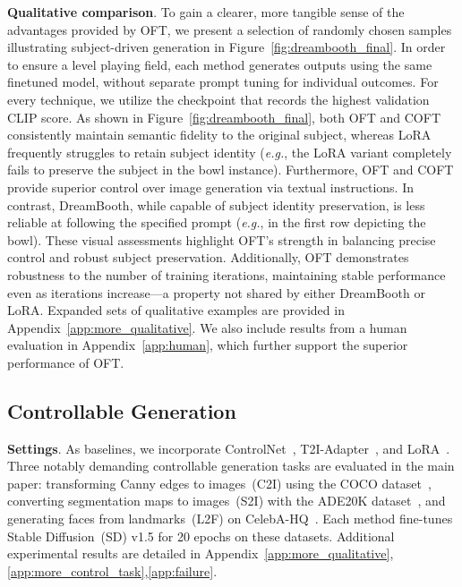 \textbf{Qualitative comparison}. To gain a clearer, more tangible sense of the advantages provided by OFT, we present a selection of randomly chosen samples illustrating subject-driven generation in Figure~\ref{fig:dreambooth_final}. In order to ensure a level playing field, each method generates outputs using the same finetuned model, without separate prompt tuning for individual outcomes. For every technique, we utilize the checkpoint that records the highest validation CLIP score. As shown in Figure~\ref{fig:dreambooth_final}, both OFT and COFT consistently maintain semantic fidelity to the original subject, whereas LoRA frequently struggles to retain subject identity (\emph{e.g.}, the LoRA variant completely fails to preserve the subject in the bowl instance). Furthermore, OFT and COFT provide superior control over image generation via textual instructions. In contrast, DreamBooth, while capable of subject identity preservation, is less reliable at following the specified prompt (\emph{e.g.}, in the first row depicting the bowl). These visual assessments highlight OFT’s strength in balancing precise control and robust subject preservation. Additionally, OFT demonstrates robustness to the number of training iterations, maintaining stable performance even as iterations increase—a property not shared by either DreamBooth or LoRA. Expanded sets of qualitative examples are provided in Appendix~\ref{app:more_qualitative}. We also include results from a human evaluation in Appendix~\ref{app:human}, which further support the superior performance of OFT.

\subsection{Controllable Generation}

\textbf{Settings}. As baselines, we incorporate ControlNet~\cite{zhang2023adding}, T2I-Adapter~\cite{mou2023t2i}, and LoRA~\cite{hulora2022}. Three notably demanding controllable generation tasks are evaluated in the main paper: transforming Canny edges to images~(C2I) using the COCO dataset~\cite{lin2014microsoft}, converting segmentation maps to images~(S2I) with the ADE20K dataset~\cite{zhou2017scene}, and generating faces from landmarks~(L2F) on CelebA-HQ~\cite{karras2018progressive,xia2021tedigan}. Each method fine-tunes Stable Diffusion~(SD) v1.5 for 20 epochs on these datasets. Additional experimental results are detailed in Appendix~\ref{app:more_qualitative},\ref{app:more_control_task},\ref{app:failure}.

